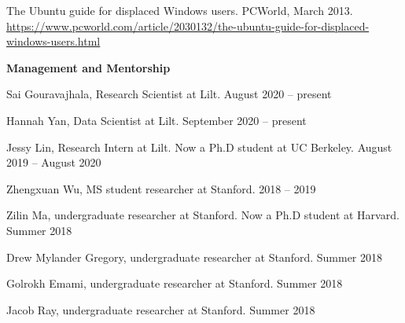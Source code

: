 \documentclass[10pt,A4]{article}
\newcommand{\cvsection}[1]
{
	\begin{center}
		\large\textcolor{sectcol}{\textbf{#1}}
	\end{center}
}
\newcommand{\mystrut}{\rule[-.3\baselineskip]{0pt}{\baselineskip}}
\begin{document}
The Ubuntu guide for displaced Windows users. PCWorld, March 2013.\\
\url{https://www.pcworld.com/article/2030132/the-ubuntu-guide-for-displaced-windows-users.html}\\

\cvsection{Management and Mentorship}

Sai Gouravajhala, Research Scientist at Lilt. \hfill \textcolor{sectcol}{August 2020 -- present}

Hannah Yan, Data Scientist at Lilt. \hfill \textcolor{sectcol}{September 2020 -- present}

Jessy Lin, Research Intern at Lilt. Now a Ph.D student at UC Berkeley. \hfill \textcolor{sectcol}{August 2019 -- August 2020}

Zhengxuan Wu, MS student researcher at Stanford. \hfill \textcolor{sectcol}{2018 -- 2019}

Zilin Ma, undergraduate researcher at Stanford. Now a Ph.D student at Harvard. \hfill \textcolor{sectcol}{Summer 2018}

Drew Mylander Gregory, undergraduate researcher at Stanford. \hfill \textcolor{sectcol}{Summer 2018}

Golrokh Emami, undergraduate researcher at Stanford. \hfill \textcolor{sectcol}{Summer 2018}

Jacob Ray, undergraduate researcher at Stanford. \hfill \textcolor{sectcol}{Summer 2018}\\





%
%
%
%
%
%
\end{document}

